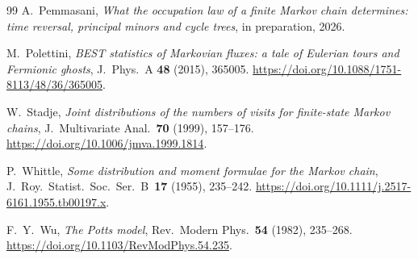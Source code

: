 \begin{thebibliography}{99}
\ifarxivbuild
{}
A.~Pemmasani, \emph{What the occupation law of a finite Markov chain
determines: time reversal, principal minors and cycle trees}, in
preparation, 2026.
\fi

M.~Polettini, \emph{BEST statistics of Markovian fluxes: a tale of Eulerian
tours and Fermionic ghosts}, J.~Phys.~A \textbf{48} (2015), 365005.
\url{https://doi.org/10.1088/1751-8113/48/36/365005}.

W.~Stadje, \emph{Joint distributions of the numbers of visits for finite-state
Markov chains}, J.~Multivariate Anal.~\textbf{70} (1999), 157--176.
\url{https://doi.org/10.1006/jmva.1999.1814}.

P.~Whittle, \emph{Some distribution and moment formulae for the Markov
chain}, J.~Roy.~Statist.~Soc.~Ser.~B~\textbf{17} (1955), 235--242.
\url{https://doi.org/10.1111/j.2517-6161.1955.tb00197.x}.

F.~Y.~Wu, \emph{The Potts model}, Rev.~Modern Phys.~\textbf{54} (1982), 235--268.
\url{https://doi.org/10.1103/RevModPhys.54.235}.

\end{thebibliography}
